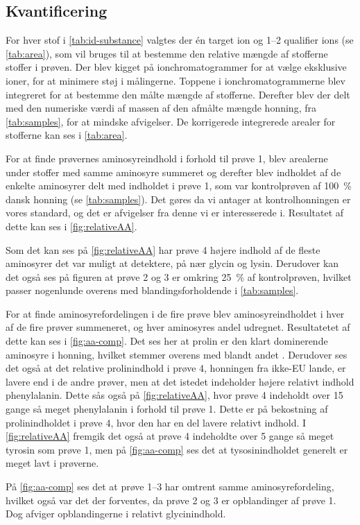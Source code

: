\subsection{Kvantificering}
\par For hver stof i \cref{tab:id-substance} valgtes der én target ion og \numrange{1}{2} qualifier ions (se \cref{tab:area}), som vil bruges til at bestemme den relative mængde af stofferne stoffer i prøven.
Der blev kigget på ionchromatogrammer for at vælge eksklusive ioner, for at minimere støj i målingerne.
Toppene i ionchromatogrammerne blev integreret for at bestemme den målte mængde af stofferne.
Derefter blev der delt med den numeriske værdi af massen af den afmålte mængde honning, fra \cref{tab:samples}, for at mindske afvigelser.
De korrigerede integrerede arealer for stofferne kan ses i \cref{tab:area}.

\par For at finde prøvernes aminosyreindhold i forhold til prøve \num{1}, blev arealerne under stoffer med samme aminosyre summeret
og derefter blev indholdet af de enkelte aminosyrer delt med indholdet i prøve \num{1}, som var kontrolprøven af \qty{100}{\percent} dansk honning (se \cref{tab:samples}).
Det gøres da vi antager at kontrolhonningen er vores standard, og det er afvigelser fra denne vi er interesserede i.
Resultatet af dette kan ses i \cref{fig:relativeAA}.

\par Som det kan ses på \cref{fig:relativeAA} har prøve \num{4} højere indhold af de fleste aminosyrer det var muligt at detektere, på nær glycin og lysin.
Derudover kan det også ses på figuren at prøve 2 og 3 er omkring \qty{25}{\percent} af kontrolprøven, hvilket passer nogenlunde overens med blandingsforholdende i \cref{tab:samples}.

\par For at finde aminosyrefordelingen i de fire prøve blev aminosyreindholdet i hver af de fire prøver summeneret, og hver aminosyres andel udregnet.
Resultatetet af dette kan ses i \cref{fig:aa-comp}. Det ses her at prolin er den klart dominerende aminosyre i honning, hvilket stemmer overens med blandt andet \cite{AAhoney,AAhoneyPl}.
Derudover ses det også at det relative prolinindhold i prøve 4, honningen fra ikke-EU lande, er lavere end i de andre prøver, men at det istedet indeholder højere relativt indhold phenylalanin.
Dette sås også på \cref{fig:relativeAA}, hvor prøve 4 indeholdt over \num{15} gange så meget phenylalanin i forhold til prøve 1.
Dette er på bekostning af prolinindholdet i prøve 4, hvor den har en del lavere relativt indhold.
I \cref{fig:relativeAA} fremgik det også at prøve 4 indeholdte over \num{5} gange så meget tyrosin som prøve 1, men på \cref{fig:aa-comp} ses det at tysosinindholdet generelt er meget lavt i prøverne.
\par På \cref{fig:aa-comp} ses det at prøve \numrange{1}{3} har omtrent samme aminosyrefordeling, hvilket også var det der forventes, da prøve 2 og 3 er opblandinger af prøve 1.
Dog afviger opblandingerne i relativt glycinindhold.
